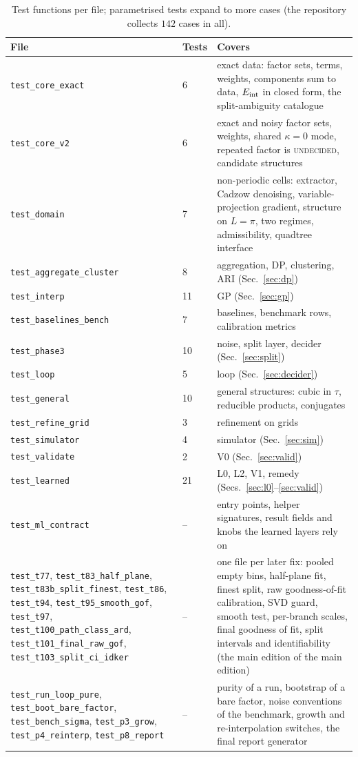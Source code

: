 \begin{table}[!htb]
\centering\small
\begin{tabular}{@{}L{4.4cm}L{1.2cm}L{6.6cm}@{}}
\toprule
File & Tests & Covers\\\midrule
\texttt{test\_core\_exact} & 6 & exact data: factor sets, terms, weights, components sum to data, $E_{\mathrm{int}}$ in closed form, the split-ambiguity catalogue\\
\texttt{test\_core\_v2} & 6 & exact and noisy factor sets, weights, shared $\kappa=0$ mode, repeated factor is \textsc{undecided}, candidate structures\\
\texttt{test\_domain} & 7 & non-periodic cells: extractor, Cadzow denoising, variable-projection gradient, structure on $L=\pi$, two regimes, admissibility, quadtree interface\\
\texttt{test\_aggregate\_cluster} & 8 & aggregation, DP, clustering, ARI (Sec.~\ref{sec:dp})\\
\texttt{test\_interp} & 11 & GP (Sec.~\ref{sec:gp})\\
\texttt{test\_baselines\_bench} & 7 & baselines, benchmark rows, calibration metrics\\
\texttt{test\_phase3} & 10 & noise, split layer, decider (Sec.~\ref{sec:split})\\
\texttt{test\_loop} & 5 & loop (Sec.~\ref{sec:decider})\\
\texttt{test\_general} & 10 & general structures: cubic in $\tau$, reducible products, conjugates\\
\texttt{test\_refine\_grid} & 3 & refinement on grids\\
\texttt{test\_simulator} & 4 & simulator (Sec.~\ref{sec:sim})\\
\texttt{test\_validate} & 2 & V0 (Sec.~\ref{sec:valid})\\
\texttt{test\_learned} & 21 & L0, L2, V1, remedy (Secs.~\ref{sec:l0}--\ref{sec:valid})\\
\texttt{test\_ml\_contract} & -- & entry points, helper signatures, result fields and knobs the learned layers rely on\\
\texttt{test\_t77}, \texttt{test\_t83\_half\_plane}, \texttt{test\_t83b\_split\_finest}, \texttt{test\_t86}, \texttt{test\_t94}, \texttt{test\_t95\_smooth\_gof}, \texttt{test\_t97}, \texttt{test\_t100\_path\_class\_ard}, \texttt{test\_t101\_final\_raw\_gof}, \texttt{test\_t103\_split\_ci\_idker} & -- & one file per later fix: pooled empty bins, half-plane fit, finest split, raw goodness-of-fit calibration, SVD guard, smooth test, per-branch scales, final goodness of fit, split intervals and identifiability (the main edition of the main edition)\\
\texttt{test\_run\_loop\_pure}, \texttt{test\_boot\_bare\_factor}, \texttt{test\_bench\_sigma}, \texttt{test\_p3\_grow}, \texttt{test\_p4\_reinterp}, \texttt{test\_p8\_report} & -- & purity of a run, bootstrap of a bare factor, noise conventions of the benchmark, growth and re-interpolation switches, the final report generator\\
\bottomrule
\end{tabular}
\caption{Test functions per file; parametrised tests expand to more cases (the repository collects $142$ cases in all).}
\end{table}

